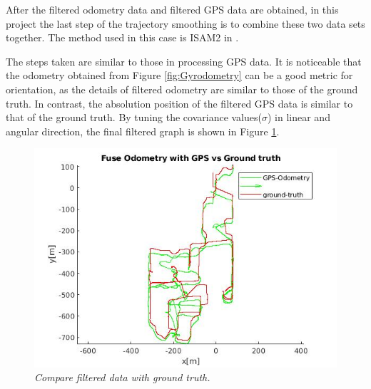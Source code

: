 After the filtered odometry data and filtered GPS data are obtained, in this project the last step of the trajectory smoothing is to combine these two data sets together. The method used in this case is ISAM2 in \cite{5979641}.

The steps taken are similar to those in processing GPS data. It is noticeable that the odometry obtained from Figure \ref{fig:Gyrodometry} can be a good metric for orientation, as the details of filtered odometry are similar to those of the ground truth. In contrast, the absolution position of the filtered GPS data is similar to that of the ground truth. By tuning the covariance values($\sigma$) in linear and angular direction, the final filtered graph is shown in Figure \ref{fig:Final plot}.

\begin{figure}[hbt!]
    \centering
    \includegraphics[width = 0.8\linewidth]{media/GPS+Odometry3.jpg}
    \caption{\textit{Compare filtered data with ground truth.}}
    \label{fig:Final plot}
\end{figure}